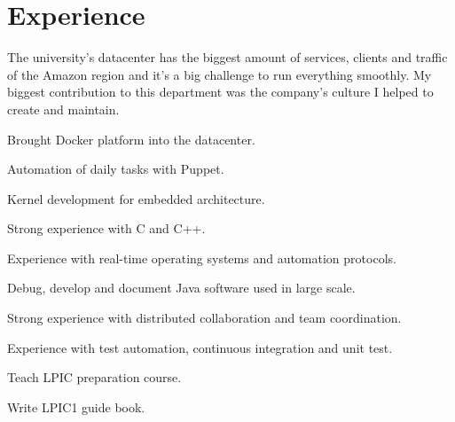 \documentclass[]{willianpaixao-resume}
\begin{document}
\begin{minipage}[t]{0.64\textwidth}

\section{Experience}
\sectionsep
The university's datacenter has the biggest amount of services, clients and
traffic of the Amazon region and it's a big challenge to run everything smoothly.
My biggest contribution to this department was the company's culture I helped to
create and maintain.
\sectionsep
\begin{tightemize}
\item Brought Docker platform into the datacenter.
\item Automation of daily tasks with Puppet.
\end{tightemize}
\sectionsep

\begin{tightemize}
\item Kernel development for embedded architecture.
\item Strong experience with C and C++.
\item Experience with real-time operating systems and automation protocols.
\end{tightemize}
\sectionsep

\begin{tightemize}
\item Debug, develop and document Java software used in large scale.
\item Strong experience with distributed collaboration and team coordination.
\item Experience with test automation, continuous integration and unit test.
\end{tightemize}
\sectionsep

\begin{tightemize}
\item Teach LPIC preparation course.
\item Write LPIC1 guide book.
\end{tightemize}
\sectionsep


\end{minipage}
\end{document}
